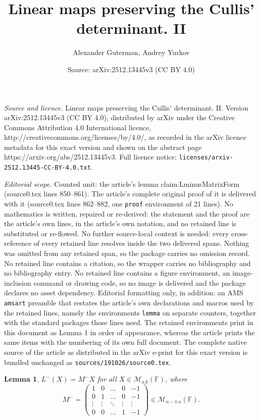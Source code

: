 \documentclass[10pt,a4paper]{amsart}
\title{Linear maps preserving the Cullis' determinant. II}
\author{Alexander Guterman, Andrey Yurkov}
\date{Source: arXiv:2512.13445v3 (CC BY 4.0)}
\newtheorem{lemma}{Lemma}
\def\F{{\mathbb F}}
\def\M{{\mathcal M}}
\begin{document}
\maketitle

\noindent\emph{Source and licence.} Linear maps preserving the Cullis' determinant. II. Version arXiv:2512.13445v3 (CC BY 4.0), distributed by arXiv under the Creative Commons Attribution 4.0 International licence, http://creativecommons.org/licenses/by/4.0/, as recorded in the arXiv licence metadata for this exact version and shown on the abstract page https://arxiv.org/abs/2512.13445v3. Full licence notice: \texttt{licenses/arxiv-2512.13445-CC-BY-4.0.txt}.\par\smallskip

\noindent\textit{Editorial scope.} Counted unit: the article's lemma claim:LminusMatrixForm (source0.tex lines 850--861). The article's complete original proof of it is delivered with it (source0.tex lines 862--882, one \texttt{proof} environment of 21 lines). No mathematics is written, repaired or re-derived: the statement and the proof are the article's own lines, in the article's own notation, and no retained line is substituted or re-flowed.  No further source-local context is needed: every cross-reference of every retained line resolves inside the two delivered spans.  Nothing was omitted from any retained span, so the package carries no omission record.  No retained line contains a citation, so the wrapper carries no bibliography and no bibliography entry.  No retained line contains a figure environment, an image-inclusion command or drawing code, so no image is delivered and the package declares no asset dependency.  Editorial formatting only, in addition: an AMS \texttt{amsart} preamble that restates the article's own declarations and macros used by the retained lines, namely the environments \texttt{lemma} on separate counters, together with the standard packages those lines need.  The retained environments print in this document as Lemma 1 in order of appearance, whereas the article prints the same items with the numbering of its own full document.  The complete native source of the article as distributed in the arXiv e-print for this exact version is bundled unchanged as \texttt{sources/191026/source0.tex}.
\begin{lemma}\label{claim:LminusMatrixForm}$L^{-}(X) = M^{-}X$ for all $X \in \M_{n\,k}(\F)$, where
\[
M^{-} =
\begin{pmatrix}
1 & 0 & \ldots & 0 & -1\\
0 & 1 & \ldots & 0 & -1\\
\vdots & \vdots & \ddots & \vdots & \vdots\\
0 & 0 & \ldots & 1 & -1
\end{pmatrix}
\in \M_{n-1\,n}(\F).
\]
  \end{lemma}
\end{document}
